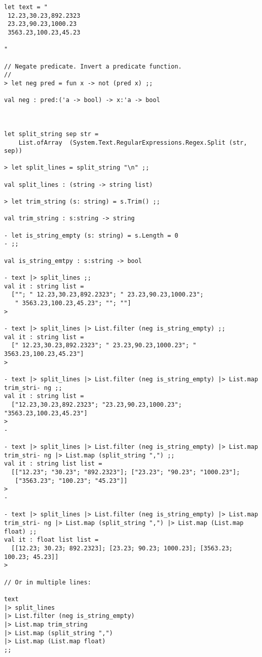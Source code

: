 \documentclass[11pt]{article}
\begin{document}
\begin{verbatim}
let text = "
 12.23,30.23,892.2323
 23.23,90.23,1000.23
 3563.23,100.23,45.23

"

// Negate predicate. Invert a predicate function. 
//
> let neg pred = fun x -> not (pred x) ;;

val neg : pred:('a -> bool) -> x:'a -> bool



let split_string sep str =                                
    List.ofArray  (System.Text.RegularExpressions.Regex.Split (str, sep))

> let split_lines = split_string "\n" ;;

val split_lines : (string -> string list)

> let trim_string (s: string) = s.Trim() ;;              

val trim_string : s:string -> string

- let is_string_empty (s: string) = s.Length = 0 
- ;;

val is_string_emtpy : s:string -> bool

- text |> split_lines ;;       
val it : string list =
  [""; " 12.23,30.23,892.2323"; " 23.23,90.23,1000.23";
   " 3563.23,100.23,45.23"; ""; ""]
> 

- text |> split_lines |> List.filter (neg is_string_empty) ;;
val it : string list =
  [" 12.23,30.23,892.2323"; " 23.23,90.23,1000.23"; " 3563.23,100.23,45.23"]
> 

- text |> split_lines |> List.filter (neg is_string_empty) |> List.map trim_stri- ng ;;
val it : string list =
  ["12.23,30.23,892.2323"; "23.23,90.23,1000.23"; "3563.23,100.23,45.23"]
> 
- 

- text |> split_lines |> List.filter (neg is_string_empty) |> List.map trim_stri- ng |> List.map (split_string ",") ;;
val it : string list list =
  [["12.23"; "30.23"; "892.2323"]; ["23.23"; "90.23"; "1000.23"];
   ["3563.23"; "100.23"; "45.23"]]
> 
- 

- text |> split_lines |> List.filter (neg is_string_empty) |> List.map trim_stri- ng |> List.map (split_string ",") |> List.map (List.map float) ;;
val it : float list list =
  [[12.23; 30.23; 892.2323]; [23.23; 90.23; 1000.23]; [3563.23; 100.23; 45.23]]
> 

// Or in multiple lines:

text 
|> split_lines 
|> List.filter (neg is_string_empty) 
|> List.map trim_string 
|> List.map (split_string ",") 
|> List.map (List.map float) 
;;


\end{verbatim}
\end{document}
